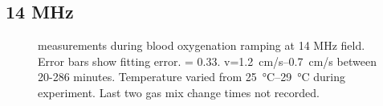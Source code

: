 \subsection{14 MHz}
\begin{figure}[htp]
\centering
{}



\caption[\Ttwo measurements during blood oxygenation ramping at 14 MHz field]{\Ttwo measurements during blood oxygenation ramping at 14 MHz field. Error bars show \Ttwo fitting error. \Hct = 0.33. v=\SIrange{1.2}{0.7}{cm/s} between  20-286 minutes. Temperature varied from \SIrange{25}{29}{\celsius} during experiment. Last two gas mix change times not recorded.}
\label{fig:contflow-14mhzT2Time}
\end{figure}


